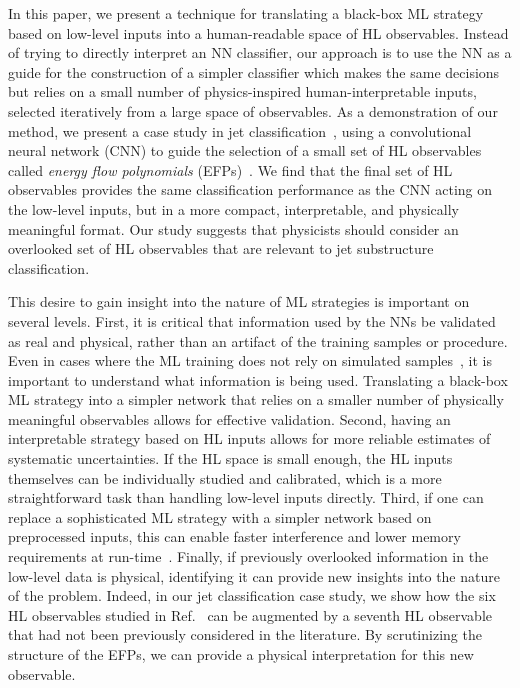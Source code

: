 \documentclass[aps,prd,twocolumn,superscriptaddress,preprintnumbers,nofootinbib,longbibliography,floatfix]{revtex4-1}
\newcommand{\rref}[1]{Ref.~\cite{#1}}
\begin{document}
In this paper, we present a technique for translating a black-box ML strategy based on low-level inputs into a human-readable space of HL observables. Instead of trying to directly interpret an NN classifier, our approach is to use the NN as a guide for the construction of a simpler classifier which makes the same decisions but relies on a small number of physics-inspired human-interpretable inputs, selected iteratively from a large space of observables. As a demonstration of our method, we present a case study in jet classification~\cite{Baldi:2016fql}, using a convolutional neural network (CNN) to guide the selection of a small set of HL observables called \emph{energy flow polynomials} (EFPs)~\cite{Komiske:2017aww}. We find that the final set of HL observables provides the same classification performance as the CNN acting on the low-level inputs, but in a more compact, interpretable, and physically meaningful format. Our study suggests that physicists should consider an overlooked set of HL observables that are relevant to jet substructure classification.

This desire to gain insight into the nature of ML strategies is important on several levels. First, it is critical that information used by the NNs be validated as real and physical, rather than an artifact of the training samples or procedure. Even in cases where the ML training does not rely on simulated samples~\cite{Metodiev:2017vrx,Andreassen:2018apy,Collins:2018epr}, it is important to understand what information is being used. Translating a  black-box ML strategy into a simpler network that relies on a smaller number of physically meaningful observables allows for effective validation. Second, having an interpretable strategy based on HL inputs allows for more reliable estimates of systematic uncertainties. If the HL space is small enough, the HL inputs themselves can be individually studied and calibrated, which is a more straightforward task than handling low-level inputs directly. Third, if one can replace a sophisticated ML strategy with a simpler network based on preprocessed inputs, this can enable faster interference and lower memory requirements at run-time~\cite{10.1145/1150402.1150464,Duarte:2018ite}. Finally, if previously overlooked information in the low-level data is physical, identifying it can provide new insights into the nature of the problem. Indeed, in our jet classification case study, we show how the six HL observables studied in \rref{Baldi:2016fql} can be augmented by a seventh HL observable that had not been previously considered in the literature. By scrutinizing the structure of the EFPs, we can provide a physical interpretation for this new observable.
\end{document}
